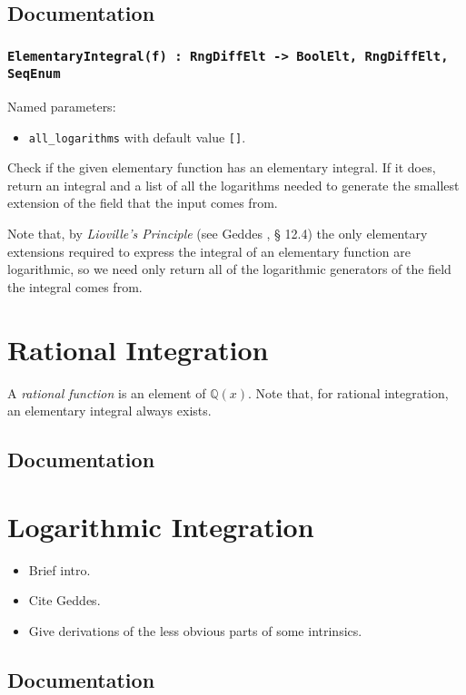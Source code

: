 \documentclass{article}
\theoremstyle{plain}
\theoremstyle{definition}
\newcommand{\Q}{\mathbb{Q}}
\begin{document}
\subsection{Documentation}

\subsubsection*{\lstinline{ElementaryIntegral(f) : RngDiffElt -> BoolElt, RngDiffElt, SeqEnum}}

Named parameters:
\begin{itemize}
    \item[] \lstinline{all_logarithms} with default value \lstinline{[]}.
\end{itemize}

\noindent Check if the given elementary function has an elementary integral. If
it does, return an integral and a list of all the logarithms needed to generate
the smallest extension of the field that the input comes from. \medbreak

Note that, by \emph{Lioville's Principle} (see Geddes \cite{geddes:afca}, \S
12.4) the only elementary extensions required to express the integral of an 
elementary function are logarithmic, so we need only return all of the
logarithmic generators of the field the integral comes from.

\section{Rational Integration}
A \emph{rational function} is an element of $\Q(x)$. Note that, for rational
integration, an elementary integral always exists.

\subsection{Documentation}

\section{Logarithmic Integration}
\begin{itemize}
    \item Brief intro.
    \item Cite Geddes.
    \item Give derivations of the less obvious parts of some intrinsics.
\end{itemize}

\subsection{Documentation}



\end{document}
